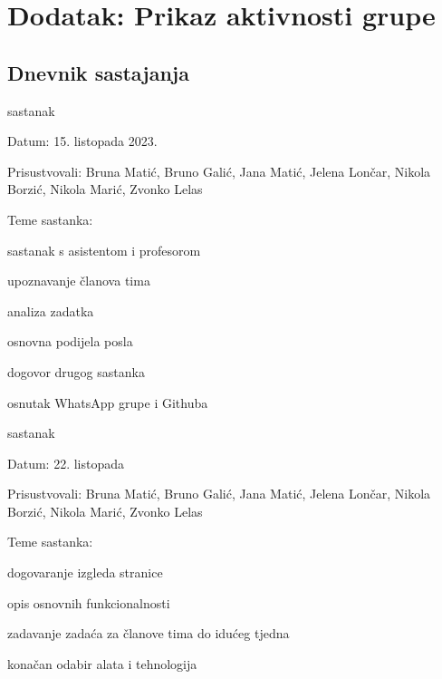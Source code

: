\chapter*{Dodatak: Prikaz aktivnosti grupe}
		
		\section*{Dnevnik sastajanja}

		\begin{packed_enum}
			\item  sastanak
			
			\item[] \begin{packed_item}
				\item Datum: 15. listopada 2023.
				\item Prisustvovali: Bruna Matić, Bruno Galić, Jana Matić, Jelena Lončar, Nikola Borzić, Nikola Marić, Zvonko Lelas
				\item Teme sastanka:
				\begin{packed_item}
					\item  sastanak s asistentom i profesorom
					\item  upoznavanje članova tima
					\item analiza zadatka
					\item osnovna podijela posla
					\item dogovor drugog sastanka
					\item osnutak WhatsApp grupe i Githuba
				\end{packed_item}
			\end{packed_item}
			
			\item  sastanak
			\item[] \begin{packed_item}
				\item Datum: 22. listopada
				\item Prisustvovali: Bruna Matić, Bruno Galić, Jana Matić, Jelena Lončar, Nikola Borzić, Nikola Marić, Zvonko Lelas
				\item Teme sastanka:
				\begin{packed_item}
					\item  dogovaranje izgleda stranice
					\item opis osnovnih funkcionalnosti
					\item zadavanje zadaća za članove tima do idućeg tjedna
					\item konačan odabir alata i tehnologija
				\end{packed_item}
			\end{packed_item}


\end{packed_enum}
